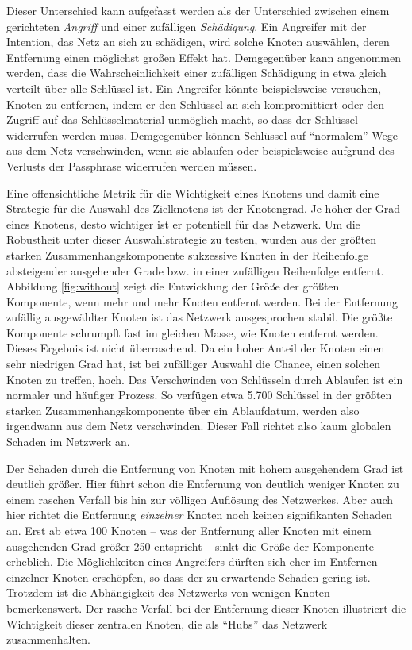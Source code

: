 Dieser Unterschied kann aufgefasst werden als der Unterschied zwischen
einem gerichteten \emph{Angriff} und einer zufälligen
\emph{Schädigung}. Ein Angreifer mit der Intention, das Netz an sich
zu schädigen, wird solche Knoten auswählen, deren Entfernung einen
möglichst großen Effekt hat. Demgegenüber kann angenommen werden,
dass die Wahrscheinlichkeit einer zufälligen Schädigung in etwa
gleich verteilt über alle Schlüssel ist. Ein Angreifer könnte
beispielsweise versuchen, Knoten zu entfernen, indem er den
Schlüssel an sich kompromittiert oder den Zugriff auf das
Schlüsselmaterial unmöglich macht, so dass der Schlüssel
widerrufen werden muss. Demgegenüber können Schlüssel auf
``normalem'' Wege aus dem Netz verschwinden, wenn sie ablaufen oder
beispielsweise aufgrund des Verlusts der Passphrase widerrufen werden
müssen.

Eine offensichtliche Metrik für die Wichtigkeit eines Knotens und
damit eine Strategie für die Auswahl des Zielknotens ist der
Knotengrad. Je höher der Grad eines Knotens, desto wichtiger ist er
potentiell für das Netzwerk. Um die Robustheit unter dieser
Auswahlstrategie zu testen, wurden aus der größten starken
Zusammenhangskomponente sukzessive Knoten in der Reihenfolge
absteigender ausgehender Grade bzw. in einer zufälligen Reihenfolge
entfernt. Abbildung \ref{fig:without} zeigt die Entwicklung der Größe
der größten Komponente, wenn mehr und mehr Knoten entfernt werden. Bei
der Entfernung zufällig ausgewählter Knoten ist das Netzwerk
ausgesprochen stabil. Die größte Komponente schrumpft fast im gleichen
Masse, wie Knoten entfernt werden. Dieses Ergebnis ist nicht
überraschend. Da ein hoher Anteil der Knoten einen sehr niedrigen Grad
hat, ist bei zufälliger Auswahl die Chance, einen solchen Knoten zu
treffen, hoch. Das Verschwinden von Schlüsseln durch Ablaufen ist ein
normaler und häufiger Prozess. So verfügen etwa 5.700 Schlüssel in der
größten starken Zusammenhangskomponente über ein Ablaufdatum, werden
also irgendwann aus dem Netz verschwinden. Dieser Fall richtet also
kaum globalen Schaden im Netzwerk an.

Der Schaden durch die Entfernung von Knoten mit hohem ausgehendem Grad
ist deutlich größer. Hier führt schon die Entfernung von deutlich
weniger Knoten zu einem raschen Verfall bis hin zur völligen
Auflösung des Netzwerkes. Aber auch hier richtet die Entfernung
\emph{einzelner} Knoten noch keinen signifikanten Schaden an. Erst ab
etwa 100 Knoten -- was der Entfernung aller Knoten mit einem
ausgehenden Grad größer 250 entspricht -- sinkt die Größe der
Komponente erheblich. Die Möglichkeiten eines Angreifers dürften
sich eher im Entfernen einzelner Knoten erschöpfen, so dass der zu
erwartende Schaden gering ist. Trotzdem ist die Abhängigkeit des
Netzwerks von wenigen Knoten bemerkenswert. Der rasche Verfall bei der
Entfernung dieser Knoten illustriert die Wichtigkeit dieser zentralen
Knoten, die als ``Hubs'' das Netzwerk zusammenhalten.

